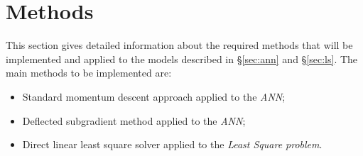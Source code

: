\section{Methods}
This section gives detailed information about the required methods that will be implemented and applied to the models described in \S\ref{sec:ann} and \S\ref{sec:ls}. The main methods to be implemented are:
\begin{itemize}
    \item Standard momentum descent approach applied to the \textit{ANN};
    \item Deflected subgradient method applied to the \textit{ANN};
    \item Direct linear least square solver applied to the \textit{Least Square problem}.
\end{itemize}




